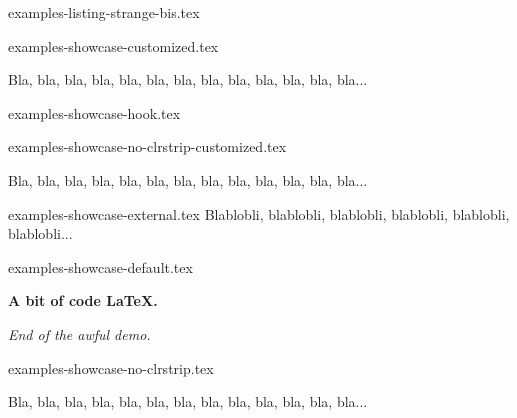 \begin{filecontents*}[overwrite]{examples-listing-strange-bis.tex}
\begin{tdoclatex}
\end{tdoclatex}
\end{filecontents*}


\begin{filecontents*}[overwrite]{examples-showcase-customized.tex}
\begin{tdocshowcase}[before = My beginning,
                     after  = My end,
                     color  = red]
    Bla, bla, bla, bla, bla, bla, bla, bla, bla, bla, bla, bla, bla...
\end{tdocshowcase}
\end{filecontents*}


\begin{filecontents*}[overwrite]{examples-showcase-hook.tex}
\begin{tdocshowcase}
\end{tdocshowcase}
\end{filecontents*}


\begin{filecontents*}[overwrite]{examples-showcase-no-clrstrip-customized.tex}
\begin{tdocshowcase}[nostripe,
                     before = My beginning,
                     after  = My end,
                     color  = green]
    Bla, bla, bla, bla, bla, bla, bla, bla, bla, bla, bla, bla, bla...
\end{tdocshowcase}
\end{filecontents*}


\begin{filecontents*}[overwrite]{examples-showcase-external.tex}
Blablobli, blablobli, blablobli, blablobli, blablobli, blablobli...
\end{filecontents*}


\begin{filecontents*}[overwrite]{examples-showcase-default.tex}
\begin{tdocshowcase}
    \bfseries A bit of code \LaTeX.

    \bigskip

    \emph{\large End of the awful demo.}
\end{tdocshowcase}
\end{filecontents*}


\begin{filecontents*}[overwrite]{examples-showcase-no-clrstrip.tex}
\begin{tdocshowcase}[nostripe]
    Bla, bla, bla, bla, bla, bla, bla, bla, bla, bla, bla, bla, bla...
\end{tdocshowcase}
\end{filecontents*}


